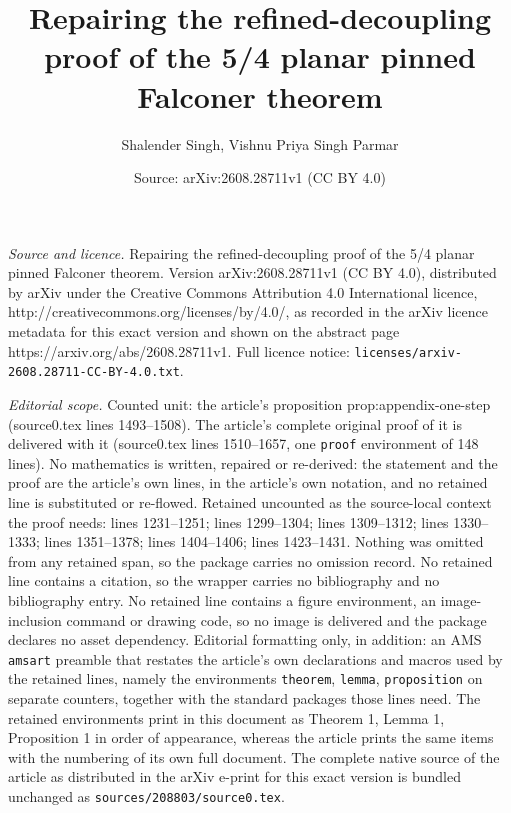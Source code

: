 \documentclass[10pt,a4paper]{amsart}
\title{Repairing the refined-decoupling proof of the 5/4 planar pinned Falconer theorem}
\author{Shalender Singh, Vishnu Priya Singh Parmar}
\date{Source: arXiv:2608.28711v1 (CC BY 4.0)}
\begin{document}
\maketitle

\noindent\emph{Source and licence.} Repairing the refined-decoupling proof of the 5/4 planar pinned Falconer theorem. Version arXiv:2608.28711v1 (CC BY 4.0), distributed by arXiv under the Creative Commons Attribution 4.0 International licence, http://creativecommons.org/licenses/by/4.0/, as recorded in the arXiv licence metadata for this exact version and shown on the abstract page https://arxiv.org/abs/2608.28711v1. Full licence notice: \texttt{licenses/arxiv-2608.28711-CC-BY-4.0.txt}.\par\smallskip

\noindent\textit{Editorial scope.} Counted unit: the article's proposition prop:appendix-one-step (source0.tex lines 1493--1508). The article's complete original proof of it is delivered with it (source0.tex lines 1510--1657, one \texttt{proof} environment of 148 lines). No mathematics is written, repaired or re-derived: the statement and the proof are the article's own lines, in the article's own notation, and no retained line is substituted or re-flowed.  Retained uncounted as the source-local context the proof needs: lines 1231--1251; lines 1299--1304; lines 1309--1312; lines 1330--1333; lines 1351--1378; lines 1404--1406; lines 1423--1431.  Nothing was omitted from any retained span, so the package carries no omission record.  No retained line contains a citation, so the wrapper carries no bibliography and no bibliography entry.  No retained line contains a figure environment, an image-inclusion command or drawing code, so no image is delivered and the package declares no asset dependency.  Editorial formatting only, in addition: an AMS \texttt{amsart} preamble that restates the article's own declarations and macros used by the retained lines, namely the environments \texttt{theorem}, \texttt{lemma}, \texttt{proposition} on separate counters, together with the standard packages those lines need.  The retained environments print in this document as Theorem 1, Lemma 1, Proposition 1 in order of appearance, whereas the article prints the same items with the numbering of its own full document.  The complete native source of the article as distributed in the arXiv e-print for this exact version is bundled unchanged as \texttt{sources/208803/source0.tex}.
\end{document}
